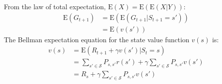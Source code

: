 \documentclass{article}
\begin{document}
From the law of total expectation, $ \text{E}(X) = \text{E}(\text{E}(X|Y)) $:
\begin{equation*}
\begin{split}
\text{E}(G_{t+1}) & = \text{E}(\text{E}(G_{t+1}|S_{t+1} = s')) \\
& = \text{E}(v(s'))
\end{split}
\end{equation*}
The Bellman expectation equation for the state value function $ v(s) $ is:
\begin{equation*}
\begin{split}
v(s) & = \text{E}(R_{t+1} + \gamma v(s') | S_t = s) \\
 & = \sum_{s' \in \mathcal{S}} P_{s,s'} r(s') + \gamma \sum_{s' \in \mathcal{S}} P_{s,s'} v(s') \\
 & = R_s + \gamma \sum_{s' \in \mathcal{S}} P_{s,s'} v(s')
\end{split}
\end{equation*}
\end{document}
